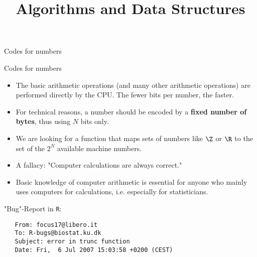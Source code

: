 \documentclass[11pt,compress,t,notes=noshow, xcolor=table]{beamer}
\title{Algorithms and Data Structures}
\begin{document}
{
  \item Codes for numbers
}



\begin{vbframe}{Codes for numbers}
\begin{itemize}


\item The basic arithmetic operations (and many other arithmetic operations)
  are performed directly by the CPU. The fewer bits per number,
  the faster.
\item For technical reasons, a number should be encoded by a
  \textbf{fixed number of bytes}, thus using $N$ bits only.
\item We are looking for a function that maps sets of numbers like $\Z$ or $\R$
   to the set of the $2^N$ available machine numbers.
\item A fallacy: "Computer calculations are always correct."
\item Basic knowledge of computer arithmetic is essential for anyone who mainly uses computers for calculations, i.e. especially for statisticians.
\end{itemize}

\framebreak

"Bug"-Report in \texttt{R}:
\small
\begin{verbatim}
   From: focus17@libero.it
   To: R-bugs@biostat.ku.dk
   Subject: error in trunc function
   Date: Fri,  6 Jul 2007 15:03:58 +0200 (CEST)


\end{verbatim}
\end{vbframe}
\end{document}
